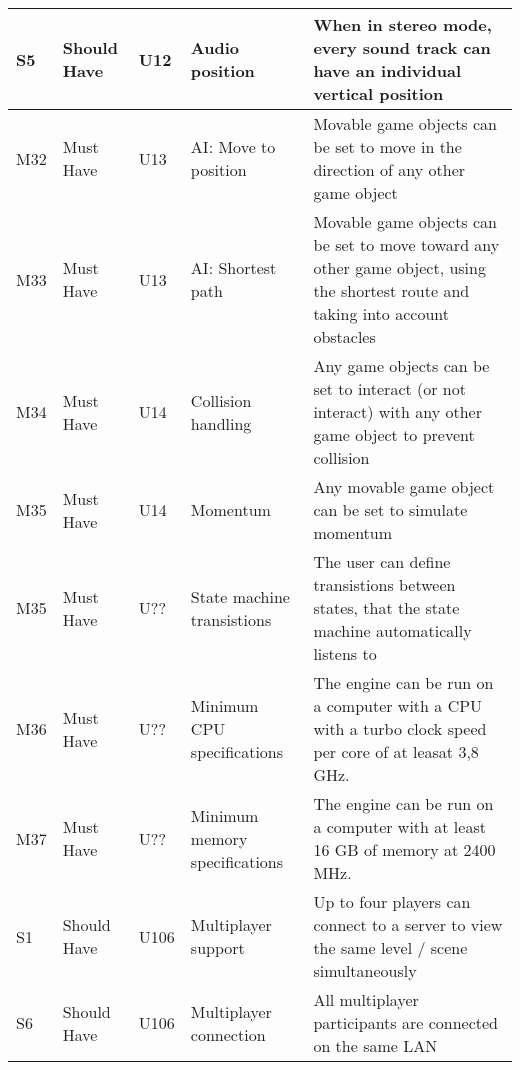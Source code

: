 \documentclass{article} %
\begin{document}
\begin{longtable}{|p{}|p{}|p{}|p{}|p{}|}
    S5                          & Should Have                        & U12                & Audio position              & When in stereo mode, every sound track can have an individual vertical position                                                                             \\ \hline
    M32                         & Must Have                          & U13                & AI: Move to position        & Movable game objects can be set to move in the direction of any other game object                                                                           \\ \hline
    M33                         & Must Have                          & U13                & AI: Shortest path           & Movable game objects can be set to move toward any other game object, using the shortest route and taking into account obstacles                            \\ \hline
    M34                         & Must Have                          & U14                & Collision handling          & Any game objects can be set to interact (or not interact) with any other game object to prevent collision                                                   \\ \hline
    M35                         & Must Have                          & U14                & Momentum                    & Any movable game object can be set to simulate momentum                                                                                                     \\ \hline
    M35 & Must Have & U?? & State machine transistions & The user can define transistions between states, that the state machine automatically listens to \\ \hline
    M36 & Must Have & U?? & Minimum CPU specifications & The engine can be run on a computer with a CPU with a turbo clock speed per core of at leasat 3,8 GHz. \\ \hline
    M37 & Must Have & U?? & Minimum memory specifications & The engine can be run on a computer with at least 16 GB of memory at 2400 MHz. \\ \hline
    S1                          & Should Have                        & U106               & Multiplayer support         & Up to four players can connect to a server to view the same level / scene simultaneously                                                                    \\ \hline
    S6                          & Should Have                        & U106               & Multiplayer connection      & All multiplayer participants are connected on the same LAN                                                                                                  \\ \hline

\end{longtable}
\end{document}
